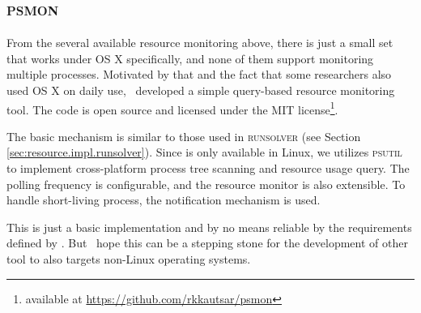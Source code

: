 \subsection{\textsc{psmon}}

From the several available resource monitoring above, there is just a small set that works under OS X specifically, and none of them support monitoring multiple processes.
Motivated by that and the fact that some researchers also used OS X on daily use, \first~developed a simple query-based resource monitoring tool.
The code is open source and licensed under the MIT license\footnote{available at \href{https://github.com/rkkautsar/psmon}{https://github.com/rkkautsar/psmon}}.

The basic mechanism is similar to those used in \textsc{runsolver} (see Section \ref{sec:resource.impl.runsolver}).
Since  is only available in Linux, we utilizes \textsc{psutil} to implement cross-platform process tree scanning and resource usage query.
The polling frequency is configurable, and the resource monitor is also extensible.
To handle short-living process, the notification mechanism  is used.

This is just a basic implementation and by no means reliable by the requirements defined by \citet{beyerReliableBenchmarkingRequirements2019}.
But \first~hope this can be a stepping stone for the development of other tool to also targets non-Linux operating systems.
